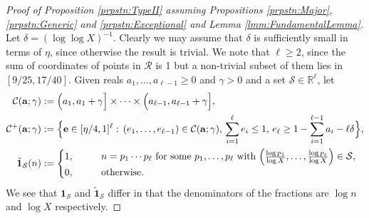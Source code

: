 \documentclass[10pt]{amsart}
\theoremstyle{plain}
\numberwithin{sblmm}{thrm}
\numberwithin{equation}{section}
\begin{document}
%
%
%
%
\begin{proof}[Proof of Proposition \ref{prpstn:TypeII} assuming Propositions \ref{prpstn:Major}, \ref{prpstn:Generic} and \ref{prpstn:Exceptional} and  Lemma \ref{lmm:FundamentalLemma}]
%
Let $\delta=(\log\log{X})^{-1}$. Clearly we may assume that $\delta$ is sufficiently small in terms of $\eta$, since otherwise the result is trivial. We note that $\ell\ge 2$, since the sum of coordinates of points in $\mathcal{R}$ is 1 but a non-trivial subset of them lies in $[9/25,17/40]$.
%
Given reals $a_1,\dots,a_{\ell-1}\ge 0$ and $\gamma>0$ and a set $\mathcal{S}\in\mathbb{R}^\ell$, let
\begin{align*}
\mathcal{C}(\mathbf{a};\gamma)&:=\Bigl(a_1,a_1+\gamma\Bigr]\times\dots \times \Bigl(a_{\ell-1},a_{\ell-1}+\gamma\Bigr],\\
\mathcal{C}^+(\mathbf{a};\gamma)&:=\Bigl\{\mathbf{e}\in[\eta/4,1]^\ell:\,(e_1,\dots,e_{\ell-1})\in\mathcal{C}(\mathbf{a};\gamma),\,\sum_{i=1}^\ell e_i\le 1,\,e_\ell\ge 1-\sum_{i=1}^{\ell-1}a_i-\ell\delta \Bigr\},\\
\tilde{\mathbf{1}}_{\mathcal{S}}(n)&:=\begin{cases}
1,\qquad &n=p_1\cdots p_\ell\text{ for some $p_1,\dots,p_{\ell}$ with }\Bigl(\frac{\log{p_1}}{\log{X}},\dots,\frac{\log{p_{\ell}}}{\log{X}}\Bigr)\in\mathcal{S},\\
%
0,&\text{otherwise.}
\end{cases}
\end{align*}
We see that $\mathbf{1}_{\mathcal{S}}$ and $\tilde{\mathbf{1}}_{\mathcal{S}}$ differ in that the denominators of the fractions are $\log{n}$ and $\log{X}$ respectively.


\end{proof}
\end{document}
